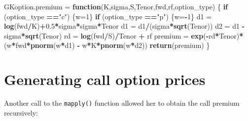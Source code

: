 \documentclass[]{book}
\newenvironment{Shaded}{\begin{snugshade}}{\end{snugshade}}
\newcommand{\KeywordTok}[1]{\textcolor[rgb]{0.13,0.29,0.53}{\textbf{#1}}}
\newcommand{\DecValTok}[1]{\textcolor[rgb]{0.00,0.00,0.81}{#1}}
\newcommand{\FloatTok}[1]{\textcolor[rgb]{0.00,0.00,0.81}{#1}}
\newcommand{\StringTok}[1]{\textcolor[rgb]{0.31,0.60,0.02}{#1}}
\newcommand{\ControlFlowTok}[1]{\textcolor[rgb]{0.13,0.29,0.53}{\textbf{#1}}}
\newcommand{\OperatorTok}[1]{\textcolor[rgb]{0.81,0.36,0.00}{\textbf{#1}}}
\newcommand{\NormalTok}[1]{#1}
\theoremstyle{definition}
\theoremstyle{definition}
\theoremstyle{definition}
\theoremstyle{remark}
\begin{document}
\begin{Shaded}
\begin{Highlighting}[]
\NormalTok{GKoption.premium =}\StringTok{ }\ControlFlowTok{function}\NormalTok{(K,sigma,S,Tenor,fwd,rf,option_type)}
\NormalTok{\{}
  \ControlFlowTok{if}\NormalTok{ (option_type }\OperatorTok{==}\StringTok{"c"}\NormalTok{) \{w=}\DecValTok{1}\NormalTok{\}}
  \ControlFlowTok{if}\NormalTok{ (option_type }\OperatorTok{==}\StringTok{"p"}\NormalTok{) \{w=}\OperatorTok{-}\DecValTok{1}\NormalTok{\}}
\NormalTok{  d1 =}\StringTok{ }\KeywordTok{log}\NormalTok{(fwd}\OperatorTok{/}\NormalTok{K)}\OperatorTok{+}\FloatTok{0.5}\OperatorTok{*}\NormalTok{sigma}\OperatorTok{*}\NormalTok{sigma}\OperatorTok{*}\NormalTok{Tenor}
\NormalTok{  d1 =}\StringTok{ }\NormalTok{d1}\OperatorTok{/}\NormalTok{(sigma}\OperatorTok{*}\KeywordTok{sqrt}\NormalTok{(Tenor))}
\NormalTok{  d2 =}\StringTok{ }\NormalTok{d1 }\OperatorTok{-}\StringTok{ }\NormalTok{sigma}\OperatorTok{*}\KeywordTok{sqrt}\NormalTok{(Tenor)}
\NormalTok{  rd =}\StringTok{ }\KeywordTok{log}\NormalTok{(fwd}\OperatorTok{/}\NormalTok{S)}\OperatorTok{/}\NormalTok{Tenor }\OperatorTok{+}\StringTok{ }\NormalTok{rf}
\NormalTok{  premium =}\StringTok{ }\KeywordTok{exp}\NormalTok{(}\OperatorTok{-}\NormalTok{rd}\OperatorTok{*}\NormalTok{Tenor)}\OperatorTok{*}\NormalTok{(w}\OperatorTok{*}\NormalTok{fwd}\OperatorTok{*}\KeywordTok{pnorm}\NormalTok{(w}\OperatorTok{*}\NormalTok{d1) }\OperatorTok{-}\StringTok{ }\NormalTok{w}\OperatorTok{*}\NormalTok{K}\OperatorTok{*}\KeywordTok{pnorm}\NormalTok{(w}\OperatorTok{*}\NormalTok{d2))}
  \KeywordTok{return}\NormalTok{(premium)}
\NormalTok{\}}
\end{Highlighting}
\end{Shaded}

\section{Generating call option
prices}\label{generating-call-option-prices}

Another call to the \texttt{mapply()} function allowed her to obtain the
call premium recursively:
\end{document}
